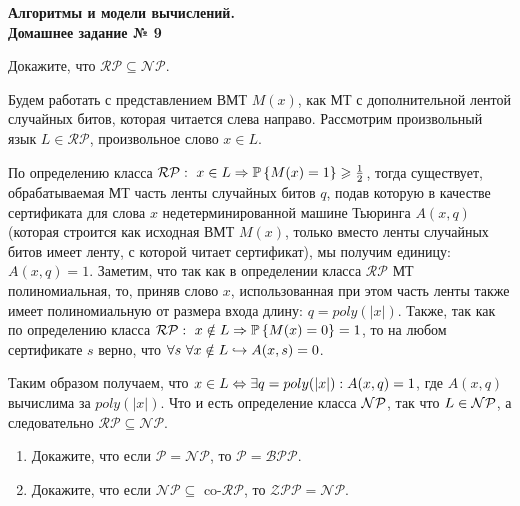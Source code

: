 \documentclass[a4paper,12pt]{article}
\newcommand{\prob}[1]{\mathbb{P}\left\{#1\right\}}
\begin{document}
	
	\thispagestyle{firstpage}
	
	\begin{center}
		\textbf{\Large{Алгоритмы и модели вычислений. \\ Домашнее задание № 9}}
	\end{center}
	

\begin{task}
	Докажите, что $\mathcal{RP}\subseteq \mathcal{NP}$.
\end{task}

\begin{solution}
	Будем работать с представлением ВМТ $M(x)$, как МТ с дополнительной лентой случайных битов, которая читается слева направо. Рассмотрим произвольный язык $L \in \mathcal{RP}$, произвольное слово $x \in L$.
	
	По определению класса $\mathcal{RP}: \ x\in L \Ra \prob{M(x) = 1} \ge \frac{1}{2}$, тогда существует, обрабатываемая МТ часть ленты случайных битов $q$, подав которую в качестве сертификата для слова $x$ недетерминированной машине Тьюринга $A(x, q)$ (которая строится как исходная ВМТ $M(x)$, только вместо ленты случайных битов имеет ленту, с которой читает сертификат), мы получим единицу:  $A(x, q) = 1$. Заметим, что так как в определении класса $\mathcal{RP}$ МТ полиномиальная, то, приняв слово $x$, использованная при этом часть ленты также имеет полиномиальную от размера входа длину: $q = poly(|x|)$. Также, так как по определению класса $\mathcal{RP}: \ x\notin L \Ra \prob{M(x) = 0} = 1$, то на любом сертификате $s$ верно, что $\forall s \  \forall x\notin L \hookrightarrow A(x, s) = 0$.
	
	Таким образом получаем, что $x \in L \Leftrightarrow \exists q = poly(|x|): A(x, q) = 1$, где $A(x, q)$ вычислима за $poly(|x|)$. Что и есть определение класса $\mathcal{NP}$, так что $L \in \mathcal{NP}$, а следовательно $\mathcal{RP}\subseteq \mathcal{NP}$.
\end{solution}


\begin{task}
	\begin{enumerate}
		\item Докажите, что если $\mathcal{P} = \mathcal{NP}$, то $\mathcal{P} = \mathcal{BPP}$.
		\item Докажите, что если $\mathcal{NP} \subseteq $ co-$\mathcal{RP}$, то $\mathcal{ZPP} = \mathcal{NP}$.
	\end{enumerate}
\end{task}
\end{document}
